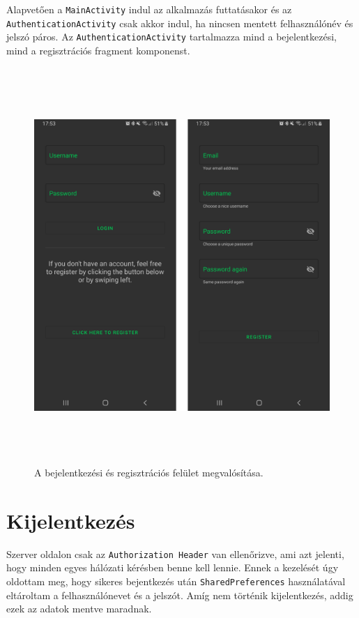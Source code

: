 \documentclass{thesis-ekf}
\theoremstyle{definition}
\theoremstyle{remark}
\begin{document}
Alapvetően a \texttt{MainActivity} indul az alkalmazás futtatásakor és az \texttt{AuthenticationActivity} csak akkor indul, ha nincsen mentett felhasználónév és jelszó páros.
Az \texttt{AuthenticationActivity} tartalmazza mind a bejelentkezési, mind a regisztrációs fragment komponenst.

\begin{figure}[!h]
	\centering
	\includegraphics[height=15cm]{pictures/android_login_registration}
	\caption{A bejelentkezési és regisztrációs felület megvalósítása.}
	\label{registration}
\end{figure}

\section{Kijelentkezés}

Szerver oldalon csak az \texttt{Authorization Header} van ellenőrizve, ami azt jelenti, hogy minden egyes hálózati kérésben benne kell lennie.
Ennek a kezelését úgy oldottam meg, hogy sikeres bejentkezés után \texttt{SharedPreferences} használatával eltároltam a felhasználónevet és a jelszót.
Amíg nem történik kijelentkezés, addig ezek az adatok mentve maradnak.
\end{document}
